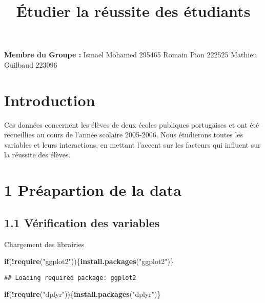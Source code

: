 \documentclass[
]{article}
\title{Étudier la réussite des étudiants}
\author{}
\date{\vspace{-2.5em}}
\newenvironment{Shaded}{\begin{snugshade}}{\end{snugshade}}
\newcommand{\ControlFlowTok}[1]{\textcolor[rgb]{0.13,0.29,0.53}{\textbf{#1}}}
\newcommand{\KeywordTok}[1]{\textcolor[rgb]{0.13,0.29,0.53}{\textbf{#1}}}
\newcommand{\NormalTok}[1]{#1}
\newcommand{\OperatorTok}[1]{\textcolor[rgb]{0.81,0.36,0.00}{\textbf{#1}}}
\newcommand{\StringTok}[1]{\textcolor[rgb]{0.31,0.60,0.02}{#1}}
\begin{document}
\maketitle

\textbf{Membre du Groupe :} Ismael Mohamed 295465 Romain Pion 222525
Mathieu Guilbaud 223096

\hypertarget{introduction}{%
\section{Introduction}\label{introduction}}

Ces données concernent les élèves de deux écoles publiques portugaises
et ont été recueillies au cours de l'année scolaire 2005-2006. Nous
étudierons toutes les variables et leurs interactions, en mettant
l'accent sur les facteurs qui influent sur la réussite des élèves.

\hypertarget{pruxe9apartion-de-la-data}{%
\section{1 Préapartion de la data}\label{pruxe9apartion-de-la-data}}

\hypertarget{vuxe9rification-des-variables}{%
\subsection{1.1 Vérification des
variables}\label{vuxe9rification-des-variables}}

Chargement des librairies

\begin{Shaded}
\begin{Highlighting}[]
\ControlFlowTok{if}\NormalTok{(}\OperatorTok{!}\KeywordTok{require}\NormalTok{(}\StringTok{"ggplot2"}\NormalTok{))\{}\KeywordTok{install.packages}\NormalTok{(}\StringTok{"ggplot2"}\NormalTok{)\}}
\end{Highlighting}
\end{Shaded}

\begin{verbatim}
## Loading required package: ggplot2
\end{verbatim}

\begin{Shaded}
\begin{Highlighting}[]
\ControlFlowTok{if}\NormalTok{(}\OperatorTok{!}\KeywordTok{require}\NormalTok{(}\StringTok{"dplyr"}\NormalTok{))\{}\KeywordTok{install.packages}\NormalTok{(}\StringTok{"dplyr"}\NormalTok{)\}}
\end{Highlighting}
\end{Shaded}
\end{document}
